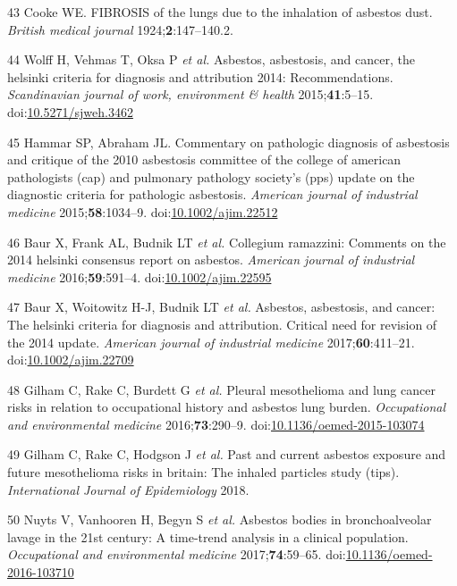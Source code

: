 \documentclass[12pt,a4paper,]{report}
\begin{document}
\leavevmode\hypertarget{ref-Cooke1924}{}%
43 Cooke WE. FIBROSIS of the lungs due to the inhalation of asbestos
dust. \emph{British medical journal} 1924;\textbf{2}:147--140.2.

\leavevmode\hypertarget{ref-Wolff2015}{}%
44 Wolff H, Vehmas T, Oksa P \emph{et al.} Asbestos, asbestosis, and
cancer, the helsinki criteria for diagnosis and attribution 2014:
Recommendations. \emph{Scandinavian journal of work, environment \&
health} 2015;\textbf{41}:5--15.
doi:\href{https://doi.org/10.5271/sjweh.3462}{10.5271/sjweh.3462}

\leavevmode\hypertarget{ref-Hammar2015}{}%
45 Hammar SP, Abraham JL. Commentary on pathologic diagnosis of
asbestosis and critique of the 2010 asbestosis committee of the college
of american pathologists (cap) and pulmonary pathology society's (pps)
update on the diagnostic criteria for pathologic asbestosis.
\emph{American journal of industrial medicine} 2015;\textbf{58}:1034--9.
doi:\href{https://doi.org/10.1002/ajim.22512}{10.1002/ajim.22512}

\leavevmode\hypertarget{ref-Baur2016}{}%
46 Baur X, Frank AL, Budnik LT \emph{et al.} Collegium ramazzini:
Comments on the 2014 helsinki consensus report on asbestos.
\emph{American journal of industrial medicine} 2016;\textbf{59}:591--4.
doi:\href{https://doi.org/10.1002/ajim.22595}{10.1002/ajim.22595}

\leavevmode\hypertarget{ref-Baur2017}{}%
47 Baur X, Woitowitz H-J, Budnik LT \emph{et al.} Asbestos, asbestosis,
and cancer: The helsinki criteria for diagnosis and attribution.
Critical need for revision of the 2014 update. \emph{American journal of
industrial medicine} 2017;\textbf{60}:411--21.
doi:\href{https://doi.org/10.1002/ajim.22709}{10.1002/ajim.22709}

\leavevmode\hypertarget{ref-Gilham2016}{}%
48 Gilham C, Rake C, Burdett G \emph{et al.} Pleural mesothelioma and
lung cancer risks in relation to occupational history and asbestos lung
burden. \emph{Occupational and environmental medicine}
2016;\textbf{73}:290--9.
doi:\href{https://doi.org/10.1136/oemed-2015-103074}{10.1136/oemed-2015-103074}

\leavevmode\hypertarget{ref-Gilham2018}{}%
49 Gilham C, Rake C, Hodgson J \emph{et al.} Past and current asbestos
exposure and future mesothelioma risks in britain: The inhaled particles
study (tips). \emph{International Journal of Epidemiology} 2018.

\leavevmode\hypertarget{ref-Nuyts2017}{}%
50 Nuyts V, Vanhooren H, Begyn S \emph{et al.} Asbestos bodies in
bronchoalveolar lavage in the 21st century: A time-trend analysis in a
clinical population. \emph{Occupational and environmental medicine}
2017;\textbf{74}:59--65.
doi:\href{https://doi.org/10.1136/oemed-2016-103710}{10.1136/oemed-2016-103710}
\end{document}
